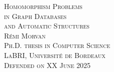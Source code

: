 \begin{titlepage}
\begin{center}
  \Huge\scshape%
  Homomorphism Problems%
  \LARGE\\%
  in Graph Databases\\%
  and Automatic Structures\\%
  \vfill
  \normalfont\LARGE{} \textsc{Rémi Morvan}\\[1em]
  \Large\scshape
  Ph.D. thesis in Computer Science\\
  \textcolor{maincolor}{LaBRI, Université de Bordeaux}\\
  \normalfont\Large\scshape Defended on XX June 2025
\end{center}
\end{titlepage}
\restoregeometry